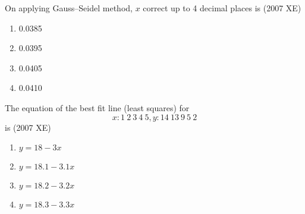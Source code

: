 	     On applying Gauss–Seidel method, $x$ correct up to 4 decimal places is
    \hfill{(2007 XE)}
    \begin{multicols}{4}
    \begin{enumerate}
        \item 0.0385
        \item 0.0395
        \item 0.0405
        \item 0.0410
    \end{enumerate}
\end{multicols}
    \item The equation of the best fit line (least squares) for 
	    $$x: 1\ 2\ 3\ 4\ 5, y: 14\ 13\ 9\ 5\ 2 $$ is
    \hfill{(2007 XE)}
    \begin{multicols}{4}
    \begin{enumerate}
        \item $y = 18 - 3x    $ 
        \item $y = 18.1 - 3.1x$
        \item $y = 18.2 - 3.2x$
        \item $y = 18.3 - 3.3x$
    \end{enumerate}
\end{multicols}
